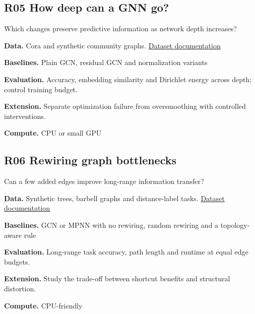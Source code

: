 \documentclass[11pt,letterpaper]{article}
\begin{document}
\begin{minipage}{\linewidth}\subsection*{R05 How deep can a GNN go?}
Which changes preserve predictive information as network depth increases?\par\textbf{Data.} Cora and synthetic community graphs. \href{https://pytorch-geometric.readthedocs.io/en/latest/generated/torch_geometric.datasets.Planetoid.html}{Dataset documentation}\par
\textbf{Baselines.} Plain GCN, residual GCN and normalization variants\par
\textbf{Evaluation.} Accuracy, embedding similarity and Dirichlet energy across depth; control training budget.\par
\textbf{Extension.} Separate optimization failure from oversmoothing with controlled interventions.\par
\textbf{Compute.} CPU or small GPU\par
\end{minipage}\par\vspace{8pt}
\begin{minipage}{\linewidth}\subsection*{R06 Rewiring graph bottlenecks}
Can a few added edges improve long-range information transfer?\par\textbf{Data.} Synthetic trees, barbell graphs and distance-label tasks. \href{https://networkx.org/documentation/stable/reference/generators.html}{Dataset documentation}\par
\textbf{Baselines.} GCN or MPNN with no rewiring, random rewiring and a topology-aware rule\par
\textbf{Evaluation.} Long-range task accuracy, path length and runtime at equal edge budgets.\par
\textbf{Extension.} Study the trade-off between shortcut benefits and structural distortion.\par
\textbf{Compute.} CPU-friendly\par
\end{minipage}\par\vspace{8pt}
\end{document}
